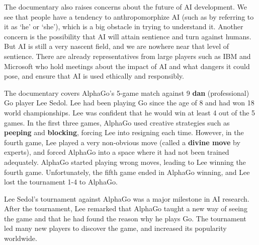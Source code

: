 \documentclass{article}
\begin{document}
The documentary also raises concerns about the future of AI development. We see that
people have a tendency to anthropomorphize AI (such as by referring to it as `he' or 
`she'), which is a big obstacle in trying to understand it. Another concern is the 
possibility that AI will attain sentience and turn against humans. But AI is still
a very nascent field, and we are nowhere near that level of sentience. There are already
representatives from large players such as IBM and Microsoft who hold meetings about
the impact of AI and what dangers it could pose, and ensure that AI is used
ethically and responsibly.

The documentary covers AlphaGo's 5-game match against 9 \textbf{dan} (professional) Go player
Lee Sedol. Lee had been playing Go since the age of 8 and had won 18 world
championships. Lee was confident that he would win at least 4 out of the 5 games.
In the first three games, AlphaGo used creative strategies such as
\textbf{peeping} and \textbf{blocking}, forcing Lee into resigning each time.
However, in the fourth game, Lee played a very non-obvious move (called a \textbf{divine move}
by experts), and forced AlphaGo into a space where it had not been trained adequately.
AlphaGo started playing wrong moves, leading to Lee winning the fourth game.
Unfortunately, the fifth game ended in AlphaGo winning, and Lee lost the tournament
1-4 to AlphaGo.

Lee Sedol's tournament against AlphaGo was a major milestone in AI research. After the
tournament, Lee remarked that AlphaGo taught a new way of seeing the
game and that he had found the reason why he plays Go. The tournament led many new
players to discover the game, and increased its popularity worldwide.
\end{document}
